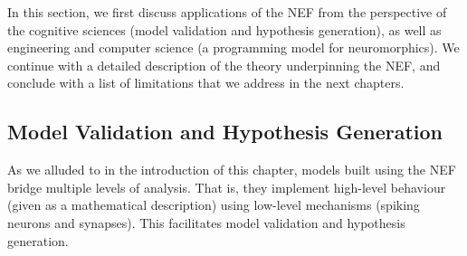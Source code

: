
In this section, we first discuss applications of the NEF from the perspective of the cognitive sciences (model validation and hypothesis generation), as well as engineering and computer science (a programming model for neuromorphics).
We continue with a detailed description of the theory underpinning the NEF, and conclude with a list of limitations that we address in the next chapters.


\subsection{Model Validation and Hypothesis Generation}

As we alluded to in the introduction of this chapter, models built using the NEF bridge multiple levels of analysis.
That is, they implement high-level behaviour (given as a mathematical description) using low-level mechanisms (spiking neurons and synapses).
This facilitates model validation and hypothesis generation.

